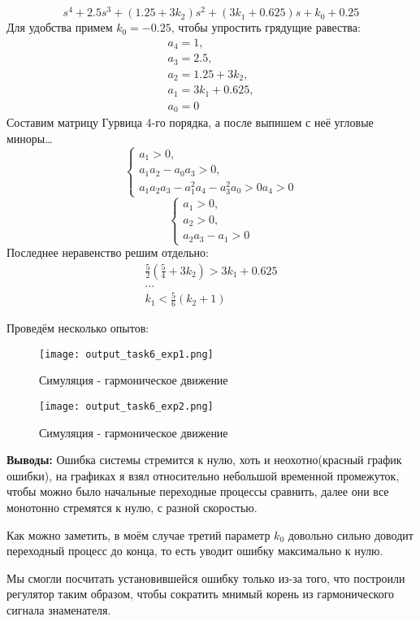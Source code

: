 $$
s^4 + 2.5s^3 + (1.25 + 3k_2)s^2 + (3k_1 + 0.625)s + k_0 + 0.25
$$
Для удобства примем $k_0 = -0.25$, чтобы упростить грядущие равества:
$$
\begin{aligned}
  a_4 = 1, \\
  a_3 = 2.5, \\
  a_2 = 1.25 + 3k_2, \\ 
  a_1 = 3k_1 + 0.625, \\
  a_0 = 0
\end{aligned}
$$
Составим матрицу Гурвица 4-го порядка, а после выпишем с неё угловые миноры\dots
$$
\begin{cases}
  a_1 > 0, \\
  a_1a_2 - a_0a_3 > 0, \\
  a_1a_2a_3 -a_1^2a_4 -a_3^2a_0 > 0
  a_4 > 0
\end{cases}
$$
$$
\begin{cases}
  a_1 > 0, \\
  a_2 > 0, \\
  a_2a_3 -a_1 > 0
\end{cases}
$$
Последнее неравенство решим отдельно:
$$
\begin{aligned}
  \frac{5}{2}(\frac{5}{4} + 3k_2) > 3k_1 + 0.625 \\
  \dots \\
  k_ 1 < \frac{5}{6}(k_2 + 1)
\end{aligned}
$$

\newpage
Проведём несколько опытов:
\begin{figure}[ht]
  \centering
  \texttt{[image: output\_task6\_exp1.png]}
\caption{Симуляция - гармоническое движение}
\end{figure}

\begin{figure}[ht]
  \centering
  \texttt{[image: output\_task6\_exp2.png]}
\caption{Симуляция - гармоническое движение}
\end{figure}
\textbf{Выводы:}  Ошибка системы стремится к нулю, хоть и неохотно(красный график ошибки), на графиках я взял относительно небольшой временной промежуток, чтобы можно было начальные переходные процессы сравнить, далее они все монотонно стремятся к нулю, с разной скоростью. 

Как можно заметить, в моём случае третий параметр $k_0$ довольно сильно доводит переходный процесс до конца, то есть уводит ошибку максимально к нулю.

Мы смогли посчитать установившейся ошибку только из-за того, что построили регулятор таким образом, чтобы сократить мнимый корень из гармонического сигнала знаменателя.

\endinput